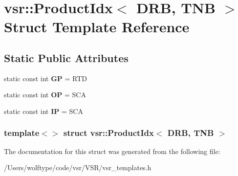 \hypertarget{structvsr_1_1_product_idx_3_01_d_r_b_00_01_t_n_b_01_4}{\section{vsr\-:\-:Product\-Idx$<$ D\-R\-B, T\-N\-B $>$ Struct Template Reference}
\label{structvsr_1_1_product_idx_3_01_d_r_b_00_01_t_n_b_01_4}
}
\subsection*{Static Public Attributes}
\begin{DoxyCompactItemize}
\item 
\hypertarget{structvsr_1_1_product_idx_3_01_d_r_b_00_01_t_n_b_01_4_a29c9400fc9bdacaf43a6eb84779bdf4a}{static const int {\bfseries G\-P} = R\-T\-D}\label{structvsr_1_1_product_idx_3_01_d_r_b_00_01_t_n_b_01_4_a29c9400fc9bdacaf43a6eb84779bdf4a}

\item 
\hypertarget{structvsr_1_1_product_idx_3_01_d_r_b_00_01_t_n_b_01_4_a08537a794691658bd7b145ca4da59dc8}{static const int {\bfseries O\-P} = S\-C\-A}\label{structvsr_1_1_product_idx_3_01_d_r_b_00_01_t_n_b_01_4_a08537a794691658bd7b145ca4da59dc8}

\item 
\hypertarget{structvsr_1_1_product_idx_3_01_d_r_b_00_01_t_n_b_01_4_a865d36804695418e82770a11746ff4ae}{static const int {\bfseries I\-P} = S\-C\-A}\label{structvsr_1_1_product_idx_3_01_d_r_b_00_01_t_n_b_01_4_a865d36804695418e82770a11746ff4ae}

\end{DoxyCompactItemize}
\subsubsection*{template$<$$>$ struct vsr\-::\-Product\-Idx$<$ D\-R\-B, T\-N\-B $>$}



The documentation for this struct was generated from the following file\-:\begin{DoxyCompactItemize}
\item 
/\-Users/wolftype/code/vsr/\-V\-S\-R/vsr\-\_\-templates.\-h\end{DoxyCompactItemize}

